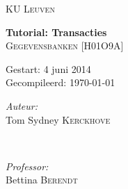 \begin{titlepage}
\thispagestyle{empty}
\newcommand{\HRule}{\rule{\linewidth}{0.5mm}}
\center
\textsc{\LARGE KU Leuven}\\[1.5cm]
\vfill


{ \Huge \bfseries Tutorial: Transacties}\\[0.4cm]
\textsc{\large Gegevensbanken [H01O9A]}\\[0.5cm]

\vspace{5cm}

\begin{Large}
Gestart: 4 juni 2014\\
Gecompileerd: \today\\
\end{Large}
\vspace{5cm}

\begin{minipage}{0.4\textwidth}
\begin{flushleft} \large
\emph{Auteur:}\\
Tom Sydney \textsc{Kerckhove}
\end{flushleft}
\end{minipage}
~
\begin{minipage}{0.4\textwidth}
\begin{flushright} \large
\emph{Professor:} \\
Bettina \textsc{Berendt}\\
\end{flushright}
\end{minipage}\\[4cm]

\vfill

\end{titlepage}
